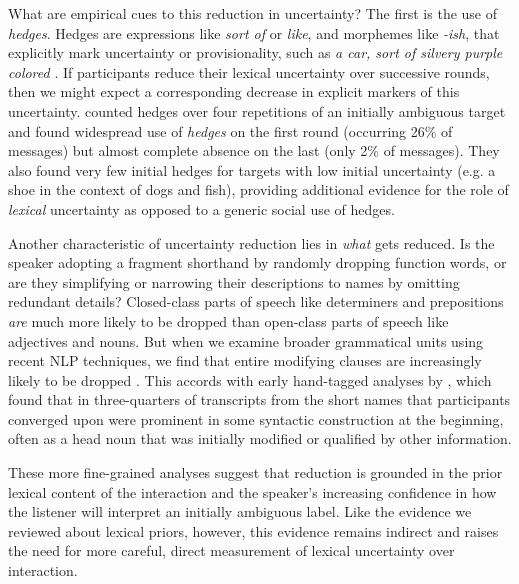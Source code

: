 \documentclass[11pt, floatsintext, jou]{apa6}
\begin{document}
What are empirical cues to this reduction in uncertainty? The first is the use of \emph{hedges}. Hedges are expressions like \emph{sort of} or \emph{like}, and morphemes like \emph{-ish}, that explicitly mark uncertainty or provisionality, such as \emph{a car, sort of silvery purple colored} \cite{BrennanClark96_ConceptualPactsConversation,Fraser10_Hedging,MedlockBriscoe07_HedgeClassification}. If participants reduce their lexical uncertainty over successive rounds, then we might expect a corresponding decrease in explicit markers of this uncertainty.  counted hedges over four repetitions of an initially ambiguous target and found widespread use of \emph{hedges} on the first round (occurring 26\% of messages) but almost complete absence on the last (only 2\% of messages). They also found very few initial hedges for targets with low initial uncertainty (e.g. a shoe in the context of dogs and fish), providing additional evidence for the role of \emph{lexical} uncertainty as opposed to a generic social use of hedges.

Another characteristic of uncertainty reduction lies in \emph{what} gets reduced. Is the speaker adopting a fragment shorthand by randomly dropping function words, or are they simplifying or narrowing their descriptions to names by omitting redundant details? Closed-class parts of speech like determiners and prepositions \emph{are} much more likely to be dropped than open-class parts of speech like adjectives and nouns. But when we examine broader grammatical units using recent NLP techniques, we find that entire modifying clauses are increasingly likely to be dropped \cite{HawkinsFrankGoodman17_ConventionFormation}. This accords with early hand-tagged analyses by , which found that in three-quarters of transcripts from  the short names that participants converged upon were prominent in some syntactic construction at the beginning, often as a head noun that was initially modified or qualified by other information. 


These more fine-grained analyses suggest that reduction is grounded in the prior lexical content of the interaction and the speaker's increasing confidence in how the listener will interpret an initially ambiguous label. Like the evidence we reviewed about lexical priors, however, this evidence remains indirect and raises the need for more careful, direct measurement of lexical uncertainty over interaction. 
\end{document}
